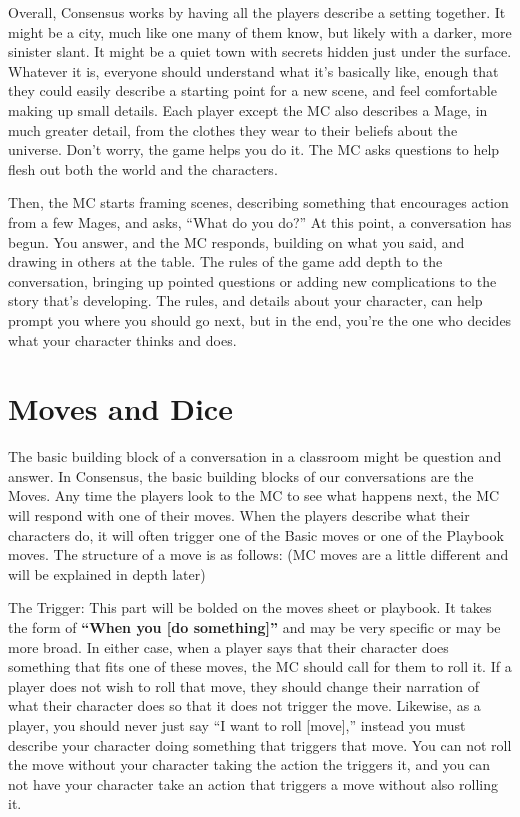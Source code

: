 \documentclass[10pt,twoside,openright]{memoir}
\begin{document}
Overall, Consensus works by having all the players describe a setting
together. It might be a city, much like one many of them know, but
likely with a darker, more sinister slant. It might be a quiet town with
secrets hidden just under the surface. Whatever it is, everyone should
understand what it's basically like, enough that they could easily
describe a starting point for a new scene, and feel comfortable making
up small details. Each player except the MC also describes a Mage, in
much greater detail, from the clothes they wear to their beliefs about
the universe. Don't worry, the game helps you do it. The MC asks
questions to help flesh out both the world and the characters.

Then, the MC starts framing scenes, describing something that encourages
action from a few Mages, and asks, ``What do you do?'' At this point, a
conversation has begun. You answer, and the MC responds, building on
what you said, and drawing in others at the table. The rules of the game
add depth to the conversation, bringing up pointed questions or adding
new complications to the story that's developing. The rules, and details
about your character, can help prompt you where you should go next, but
in the end, you're the one who decides what your character thinks and
does.

\hypertarget{moves-and-dice}{%
\section{Moves and Dice}\label{moves-and-dice}}

The basic building block of a conversation in a classroom might be
question and answer. In Consensus, the basic building blocks of our
conversations are the Moves. Any time the players look to the MC to see
what happens next, the MC will respond with one of their moves. When the
players describe what their characters do, it will often trigger one of
the Basic moves or one of the Playbook moves. The structure of a move is
as follows: (MC moves are a little different and will be explained in
depth later)

The Trigger: This part will be bolded on the moves sheet or playbook. It
takes the form of \textbf{``When you {[}do something{]}''} and may be
very specific or may be more broad. In either case, when a player says
that their character does something that fits one of these moves, the MC
should call for them to roll it. If a player does not wish to roll that
move, they should change their narration of what their character does so
that it does not trigger the move. Likewise, as a player, you should
never just say ``I want to roll {[}move{]},'' instead you must describe
your character doing something that triggers that move. You can not roll
the move without your character taking the action the triggers it, and
you can not have your character take an action that triggers a move
without also rolling it.
\end{document}
